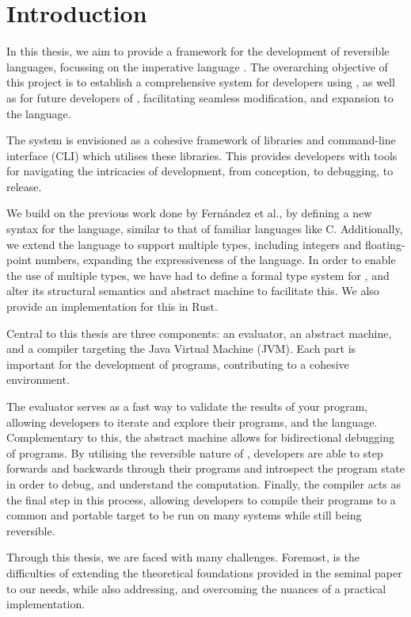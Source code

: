 \chapter{Introduction}

In this thesis, we aim to provide a framework for the development of reversible languages, focussing on the imperative language \rimplang. The overarching objective of this project is to establish a comprehensive system for developers using \rimplang, as well as for future developers of \rimplang, facilitating seamless modification, and expansion to the language. 

The system is envisioned as a cohesive framework of libraries and command-line interface (CLI) which utilises these libraries. This provides developers with tools for navigating the intricacies of development, from conception, to debugging, to release.

We build on the previous work done by Fern{\'a}ndez et al.\cite{Rimp}, by defining a new syntax for the language, similar to that of familiar languages like C. Additionally, we extend the language to support multiple types, including integers and floating-point numbers, expanding the expressiveness of the language. In order to enable the use of multiple types, we have had to define a formal type system for \rimplang, and alter its structural semantics and abstract machine to facilitate this. We also provide an implementation for this in Rust.

Central to this thesis are three components: an evaluator, an abstract machine, and a compiler targeting the Java Virtual Machine (JVM). Each part is important for the development of \rimplang programs, contributing to a cohesive environment.

The evaluator serves as a fast way to validate the results of your program, allowing developers to iterate and explore their programs, and the \rimplang language.
Complementary to this, the abstract machine allows for bidirectional debugging of \rimplang programs. By utilising the reversible nature of \rimplang, developers are able to step forwards and backwards through their programs and introspect the program state in order to debug, and understand the computation. Finally, the compiler acts as the final step in this process, allowing developers to compile their programs to a common and portable target to be run on many systems while still being reversible.

Through this thesis, we are faced with many challenges. Foremost, is the difficulties of extending the theoretical foundations provided in the seminal \rimplang paper\cite{Rimp} to our needs, while also addressing, and overcoming the nuances of a practical implementation.
